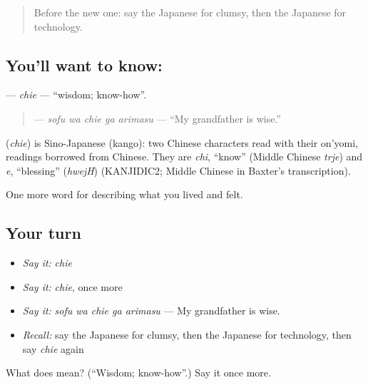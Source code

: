 \label{lesson:JA-C481-chie}



\begin{quote}
Before the new one: say the Japanese for clumsy, then the Japanese for technology.
\end{quote}

\subsection*{You'll want to know: }
\textbf{} — \emph{chie} — \textquotedblleft{}wisdom; know-how\textquotedblright{}.

\begin{quote}
\textbf{  } — \emph{sofu wa chie ga arimasu} — \textquotedblleft{}My grandfather is wise.\textquotedblright{}
\end{quote}

\begin{cousinweb}
\textbf{} (\emph{chie}) is Sino-Japanese (kango): two Chinese characters read with their on'yomi, readings borrowed from Chinese. They are \emph{chi}, \textquotedblleft{}know\textquotedblright{} (Middle Chinese \emph{trje}) and \emph{e}, \textquotedblleft{}blessing\textquotedblright{} (\emph{hwejH}) (KANJIDIC2; Middle Chinese in Baxter's transcription).
\end{cousinweb}

\begin{grammarlens}[title={What you've built}]
One more word for describing what you lived and felt.
\end{grammarlens}

\subsection*{Your turn}
\begin{itemize}
\raggedright
  \item \emph{Say it:} \emph{chie}
  \item \emph{Say it:} \emph{chie}, once more
  \item \emph{Say it:} \emph{sofu wa chie ga arimasu} — My grandfather is wise.
  \item \emph{Recall:} say the Japanese for clumsy, then the Japanese for technology, then say \emph{chie} again
\end{itemize}

\begin{tcolorbox}[breakable,colback=teal!4,colframe=teal!35!black,title={Before you move on}]
What does  mean? (\textquotedblleft{}Wisdom; know-how\textquotedblright{}.) Say it once more.
\end{tcolorbox}
